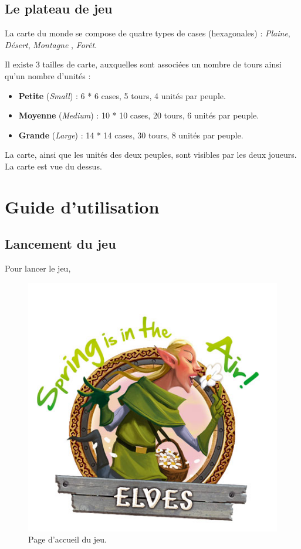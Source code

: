 \subsection{Le plateau de jeu}

La carte du monde se compose de quatre types de cases (hexagonales) : \textit{Plaine}, \textit{Désert}, \textit{Montagne} , \textit{Forêt}.

Il existe 3 tailles de carte, auxquelles sont associées un nombre de tours ainsi qu'un nombre d'unités :

\begin{itemize}

\item \textbf{Petite} (\textit{Small}) : 6 * 6 cases, 5 tours, 4 unités par peuple.
\item \textbf{Moyenne} (\textit{Medium}) : 10 * 10 cases, 20 tours, 6 unités par peuple.
\item \textbf{Grande} (\textit{Large}) : 14 * 14 cases, 30 tours, 8 unités par peuple.

\end{itemize}

La carte, ainsi que les unités des deux peuples, sont visibles par les deux joueurs. La carte est vue du dessus.

\section{Guide d'utilisation}

\subsection{Lancement du jeu}

Pour lancer le jeu, 

\begin{figure}[!h]
    \centering
    \includegraphics[height=0.70\textwidth]{figure/ecranAccueil.png}
    \caption{Page d'accueil du jeu.}
    \label{fig:ecranAccueil}
\end{figure} 

